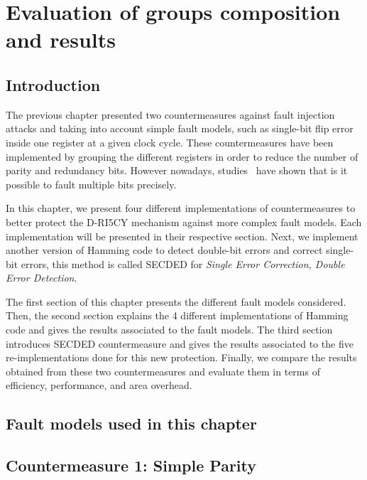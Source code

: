 \chapter{Evaluation of groups composition and results}
\label{chapter:exp_setup_results}
\minitoc

\section{Introduction}
The previous chapter presented two countermeasures against fault injection attacks and taking into account simple fault models, such as single-bit flip error inside one register at a given clock cycle. These countermeasures have been implemented by grouping the different registers in order to reduce the number of parity and redundancy bits. However nowadays, studies~\cite{CGVCBLC-22-cardis,VDSPB-24-jce} have shown that is it possible to fault multiple bits precisely.

In this chapter, we present four different implementations of countermeasures to better protect the D-RI5CY mechanism against more complex fault models. Each implementation will be presented in their respective section. Next, we implement another version of Hamming code to detect double-bit errors and correct single-bit errors, this method is called SECDED for \textit{Single Error Correction, Double Error Detection}.

The first section of this chapter presents the different fault models considered. Then, the second section explains the 4 different implementations of Hamming code and gives the results associated to the fault models. The third section introduces SECDED countermeasure and gives the results associated to the five re-implementations done for this new protection. Finally,  we compare the results obtained from these two countermeasures and evaluate them in terms of efficiency, performance, and area overhead.

\section{Fault models used in this chapter}


\section{Countermeasure 1: Simple Parity}

